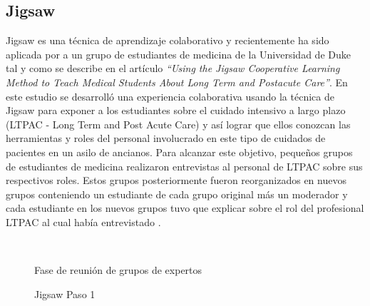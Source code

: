 \subsection{Jigsaw}
Jigsaw es una técnica de aprendizaje colaborativo y recientemente ha sido aplicada por  a un grupo de estudiantes de medicina  de la Universidad de Duke tal y como se describe en el artículo \emph{``Using the Jigsaw Cooperative Learning Method to Teach Medical Students About Long Term and Postacute Care''}. En este estudio se desarrolló una experiencia colaborativa usando la técnica de Jigsaw para exponer a los estudiantes sobre el cuidado intensivo a largo plazo  (LTPAC - Long Term and Post Acute Care) y así lograr que ellos conozcan las herramientas y roles del personal involucrado en este tipo de cuidados de pacientes en un asilo de ancianos. Para alcanzar este objetivo, pequeños grupos de estudiantes de medicina realizaron entrevistas al personal de LTPAC sobre sus respectivos roles. Estos grupos posteriormente fueron reorganizados en nuevos grupos conteniendo un estudiante de cada grupo original más un moderador y cada estudiante en los nuevos grupos tuvo que explicar sobre el rol del profesional LTPAC al cual había entrevistado \cite{Buhr2014429}.\\

\begin{figure}[!h]
  \centering
  \\
  \caption{Jigsaw Paso 1}{Fase de reunión de grupos de expertos \protect\cite{Buhr2014429} }
  \label{fig:jigsaw_ltpac_1}
\end{figure}

